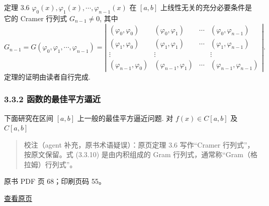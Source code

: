 定理 3.6 \(\varphi_0(x), \varphi_1(x), \cdots, \varphi_{n-1}(x)\) 在 \([a,b]\) 上线性无关的充分必要条件是它的 Cramer 行列式 \(G_{n-1} \neq 0\), 其中 \[
G_{n-1} = G(\varphi_0, \varphi_1, \cdots, \varphi_{n-1}) = \left| \begin{array}{cccc} (\varphi_0, \varphi_0) & (\varphi_0, \varphi_1) & \cdots & (\varphi_0, \varphi_{n-1}) \\ (\varphi_1, \varphi_0) & (\varphi_1, \varphi_1) & \cdots & (\varphi_1, \varphi_{n-1}) \\ \vdots & \vdots & & \vdots \\ (\varphi_{n-1}, \varphi_0) & (\varphi_{n-1}, \varphi_1) & \cdots & (\varphi_{n-1}, \varphi_{n-1}) \end{array} \right|. \tag{3.3.10}
\] 定理的证明由读者自行完成.

\subsubsection{3.3.2 函数的最佳平方逼近}\label{ch03a-ux51fdux6570ux7684ux6700ux4f73ux5e73ux65b9ux903cux8fd1}

下面研究在区间 \([a,b]\) 上一般的最佳平方逼近问题. 对 \(f(x) \in C[a,b]\) 及 \(C[a,b]\)

\begin{quote}
校注（agent 补充，原书术语疑误）：原页定理 3.6 写作``Cramer 行列式''，按原文保留。式 (3.3.10) 是由内积组成的 Gram 行列式，通常称``Gram（格拉姆）行列式''。
\end{quote}

\clearpage

原书 PDF 页 68；印刷页码 55。

\href{source-images/pdf-068.jpeg}{查看原页}

